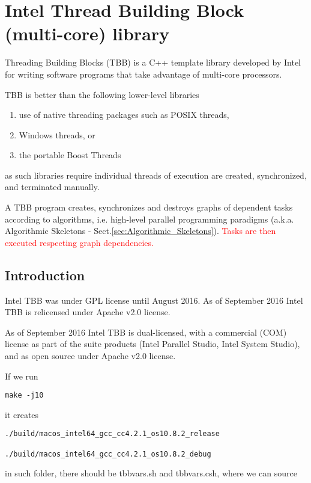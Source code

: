 \chapter[Intel Thread Building Block]{Intel Thread Building Block (multi-core)
library}
\label{chap:TBB}

Threading Building Blocks (TBB) is a C++ template library developed by Intel for
writing software programs that take advantage of multi-core processors.

TBB is better than the following lower-level libraries
\begin{enumerate}
  \item  use of native threading packages such as POSIX threads, 
  
  \item Windows  threads, or 
  
  \item the portable Boost Threads
\end{enumerate}
as such libraries require individual threads of execution are created,
synchronized, and terminated manually.

A TBB program creates, synchronizes and destroys graphs of dependent tasks
according to algorithms, i.e. high-level parallel programming paradigms (a.k.a.
Algorithmic Skeletons - Sect.\ref{sec:Algorithmic_Skeletons}).
\textcolor{red}{Tasks are then executed respecting graph dependencies.}

\section{Introduction}

Intel TBB was under GPL license until August 2016. As of September 2016 Intel
TBB is relicensed under Apache v2.0 license.

As of September 2016 Intel TBB is dual-licensed, with a commercial (COM)
license as part of the suite products (Intel Parallel Studio, Intel System
Studio), and as open source under Apache v2.0 license.

If we run
\begin{verbatim}
make -j10
\end{verbatim}
it creates
\begin{verbatim}
./build/macos_intel64_gcc_cc4.2.1_os10.8.2_release

./build/macos_intel64_gcc_cc4.2.1_os10.8.2_debug
\end{verbatim}
in such folder, there should be tbbvars.sh and tbbvars.csh, where we can source


